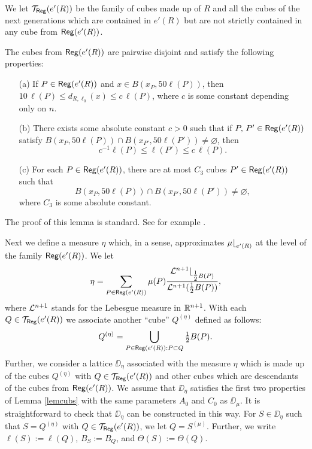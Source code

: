 We let ${\mathcal T}_{\mathsf{Reg}}(e'(R))$ be the family of cubes made up of $R$ and all the cubes of the next generations which are contained in $e'(R)$ but are not 
strictly contained in any cube from ${\mathsf{Reg}}(e'(R))$.



\vv

\begin{lemma}\label{lem74}
The cubes from ${\mathsf{Reg}}(e'(R))$ are pairwise disjoint and satisfy the following properties:
\begin{itemize}
\item[(a)] If $P\in{\mathsf{Reg}}(e'(R))$ and $x\in B(x_{P},50\ell(P))$, then $10\,\ell(P)\leq d_{R,\ell_0}(x) \leq c\,\ell(P)$,
where $c$ is some constant depending only on $n$. 

\item[(b)] There exists some absolute constant $c>0$ such that if $P,\,P'\in{\mathsf{Reg}}(e'(R))$ satisfy $B(x_{P},50\ell(P))\cap B(x_{P'},50\ell(P'))
\neq\varnothing$, then
$$c^{-1}\ell(P)\leq \ell(P')\leq c\,\ell(P).$$
\item[(c)] For each $P\in {\mathsf{Reg}}(e'(R))$, there are at most $C_3$ cubes $P'\in{\mathsf{Reg}}(e'(R))$ such that
$$B(x_{P},50\ell(P))\cap B(x_{P'},50\ell(P'))
\neq\varnothing,$$
 where $C_3$ is some absolute constant.
 
\end{itemize}
\end{lemma}

The proof of this lemma is standard. See for example \cite[Lemma 6.6]{Tolsa-memo}.

\vvv

Next we define a measure $\eta$ which, in a sense, approximates $\mu{\lfloor}_{e'(R)}$ at the level of the family ${\mathsf{Reg}}(e'(R))$. 
We let
$$\eta = \sum_{P\in{\mathsf{Reg}}(e'(R))} \mu(P) \frac{{\mathcal L}^{n+1}{\lfloor}_{\tfrac12B(P)}}{{\mathcal L}^{n+1}(\tfrac12B(P))},
$$
where ${\mathcal L}^{n+1}$ stands for the Lebesgue measure in ${\mathbb R}^{n+1}$.
With each $Q\in{\mathcal T}_{{\mathsf{Reg}}}(e'(R))$ we associate another ``cube'' $Q^{(\eta)}$ defined as follows:
$$Q^{(\eta)}= \bigcup_{P\in{\mathsf{Reg}}(e'(R)):P\subset Q} \tfrac12B(P).$$
Further, we consider a lattice $\DD_\eta$ associated with the measure $\eta$ which is made up of the cubes
$Q^{(\eta)}$ with $Q\in {\mathcal T}_{{\mathsf{Reg}}}(e'(R))$ and other cubes which are descendants of the cubes from ${\mathsf{Reg}}(e'(R))$.
We assume that $\DD_\eta$ satisfies the first two properties of Lemma \ref{lemcubs} with the same parameters $A_0$ and $C_0$ as $\DD_\mu$. It is straightforward to check that $\DD_\eta$ can be constructed in this way.
For $S\in\DD_\eta$ such that $S=Q^{(\eta)}$ with $Q\in{\mathcal T}_{{\mathsf{Reg}}}(e'(R))$, we let $Q=S^{(\mu)}$. Further, we write
$\ell(S):=\ell(Q)$, $B_S:=B_Q$, and $\Theta(S):=\Theta(Q)$.


